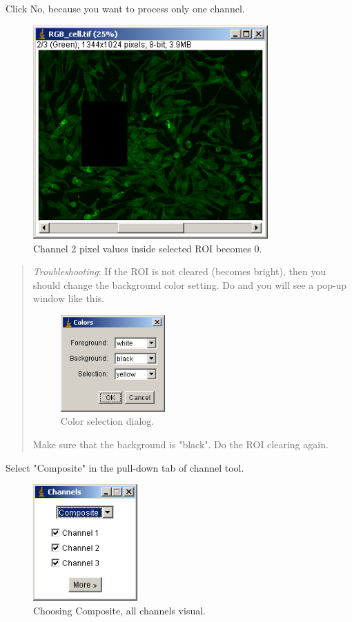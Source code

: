 \begin{indentexercise}{1}
Click No, because you want to process only one channel. 
\begin{figure}[H]
\begin{center}
\includegraphics[width=9cm]{fig/CMCIBasicCourse201102-img20.png}
\caption{ Channel 2 pixel values inside selected ROI becomes 0.}
\label{fig:img20}
\end{center}
\end{figure}
\begin{quote}
\textit{Troubleshooting}: If the ROI is not cleared (becomes bright), then you should change the background color setting. Do  and you will see a pop-up window like this. 
\begin{figure}[H]
\begin{center}
\includegraphics[width=4cm]{fig/CMCIBasicCourse201102-img21.png}
\caption{ Color selection dialog.}
\label{fig:img21}
\end{center}
\end{figure}

Make sure that the background is "black". Do the ROI clearing again. 
\end{quote}
Select "Composite" in the pull-down tab of channel tool. 
\begin{figure}[H]
\begin{center}
\includegraphics[width=4cm]{fig/CMCIBasicCourse201102-img22.png}
\caption{ Choosing Composite, all channels visual.}
\label{fig:img22}
\end{center}
\end{figure}


\end{indentexercise}
